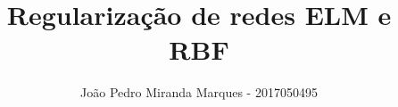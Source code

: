 \documentclass[10pt]{article}
\title{\LARGE \bf
Regularização de redes ELM e RBF 
}
\author{João Pedro Miranda Marques - 2017050495}
\begin{document}
\maketitle
\begin{multicols}{2}















\end{multicols}
\printbibliography
\end{document}
